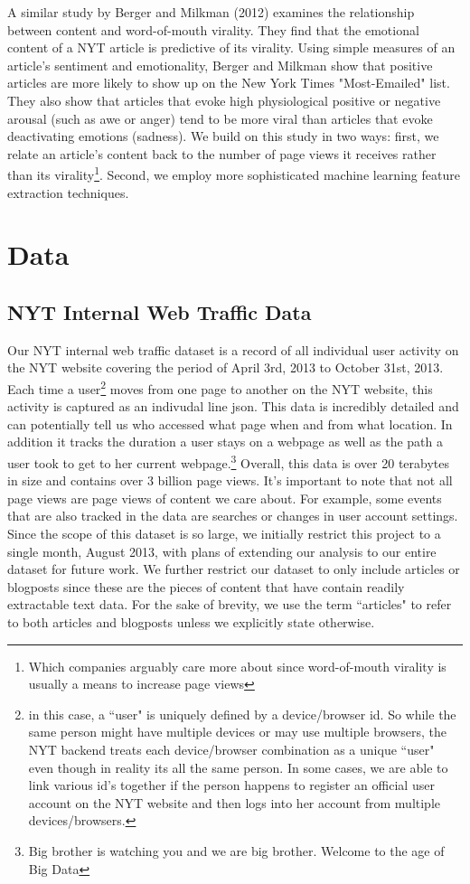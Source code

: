 \documentclass[fleqn,12pt]{SelfArx} %
\begin{document}
A similar study by Berger and Milkman (2012) \cite{berger2012makes} examines the relationship between content and word-of-mouth virality. They find that the emotional content of a NYT article is predictive of its virality. Using simple measures of an article's sentiment and emotionality, Berger and Milkman show that positive articles are more likely to show up on the New York Times "Most-Emailed" list. They also show that articles that evoke high physiological positive or negative arousal (such as awe or anger) tend to be more viral than articles that evoke deactivating emotions (sadness). We build on this study in two ways: first, we relate an article's content back to the number of page views it receives rather than its virality\footnote{Which companies arguably care more about since word-of-mouth virality is usually a means to increase page views}. Second, we employ more sophisticated machine learning feature extraction techniques.

\section{Data}
\subsection{NYT Internal Web Traffic Data}
Our NYT internal web traffic dataset is a record of all individual user activity on the NYT website covering the period of April 3rd, 2013 to October 31st, 2013. Each time a user\footnote{in this case, a ``user" is uniquely defined by a device/browser id. So while the same person might have multiple devices or may use multiple browsers, the NYT backend treats each device/browser combination as a unique ``user" even though in reality its all the same person. In some cases, we are able to link various id's together if the person happens to register an official user account on the NYT website and then logs into her account from multiple devices/browsers.} moves from one page to another on the NYT website, this activity is captured as an indivudal line json. This data is incredibly detailed and can potentially tell us who accessed what page when and from what location. In addition it tracks the duration a user stays on a webpage as well as the path a user took to get to her current webpage.\footnote{Big brother is watching you and we are big brother. Welcome to the age of Big Data} Overall, this data is over 20 terabytes in size and contains over 3 billion page views. It's important to note that not all page views are page views of content we care about. For example, some events that are also tracked in the data are searches or changes in user account settings. Since the scope of this dataset is so large, we initially restrict this project to a single month, August 2013, with plans of extending our analysis to our entire dataset for future work. We further restrict our dataset to only include articles or blogposts since these are the pieces of content that have contain readily extractable text data. For the sake of brevity, we use the term ``articles" to refer to both articles and blogposts unless we explicitly state otherwise. 
\end{document}
